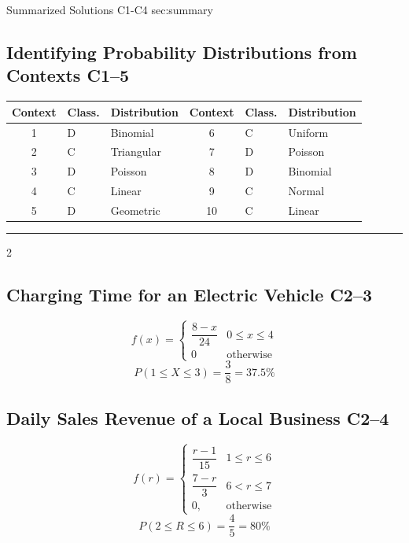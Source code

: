 	

	\sectionScored
	{Summarized Solutions}
	{C1-C4}
	{sec:summary}
	{
		\subsection{Identifying Probability Distributions from Contexts \hfill C1--5}
		\begin{center}
			\begin{tabular}{cll@{\qquad}cll}
				\toprule
				Context & Class. & Distribution & Context & Class. & Distribution \\
				\midrule
				1 & D & Binomial   & 6  & C & Uniform \\
				2 & C & Triangular & 7  & D & Poisson \\
				3 & D & Poisson    & 8  & D & Binomial \\
				4 & C & Linear     & 9  & C & Normal \\
				5 & D & Geometric  & 10 & C & Linear \\
				\bottomrule
			\end{tabular}
		\end{center}
	
		\setlength{\columnseprule}{0.4pt}
		\noindent\rule{\textwidth}{0.5pt}
	
		\begin{multicols}{2}
		\subsection{Charging Time for an Electric Vehicle \hfill C2--3}
		\[
		f(x)=
		\begin{cases}
			\dfrac{8-x}{24}&0\le x\le4\\[1mm]
			0&\text{otherwise}
		\end{cases}
		\]\[
		\boxed{P(1\le X\le3)=\frac38=37.5\%}
		\]

		\subsection{Daily Sales Revenue of a Local Business \hfill C2--4}
		\[
		f(r)=
		\begin{cases}
			\dfrac{r-1}{15}&1\le r\le6\\[1mm]
			\dfrac{7-r}{3}&6<r\le7\\[1mm]
			0,&\text{otherwise}
		\end{cases}
		\]\[
		\boxed{P(2\le R\le6)=\frac45=80\%}
		\]
		\end{multicols}
		
}
